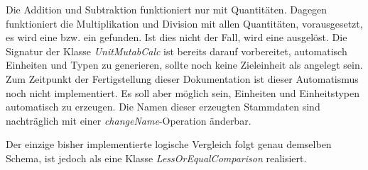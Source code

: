 Die Addition und Subtraktion funktioniert nur mit  Quantitäten. Dagegen funktioniert die Multiplikation und Division mit allen Quantitäten, vorausgesetzt, es wird eine  bzw. ein  gefunden. Ist dies nicht der Fall, wird eine  ausgelöst. Die Signatur der Klasse 
\textit{UnitMutabCalc} ist bereits darauf vorbereitet, automatisch Einheiten und Typen zu generieren, sollte noch keine Zieleinheit als  angelegt sein. Zum Zeitpunkt der Fertigstellung dieser Dokumentation ist dieser Automatismus noch nicht implementiert. Es soll aber möglich sein, Einheiten und Einheitstypen automatisch zu erzeugen. Die Namen dieser erzeugten Stammdaten sind nachträglich mit einer \textit{changeName}-Operation änderbar.

Der einzige bisher implementierte logische Vergleich  folgt genau demselben Schema, ist jedoch als eine Klasse \textit{LessOrEqualComparison} realisiert.
